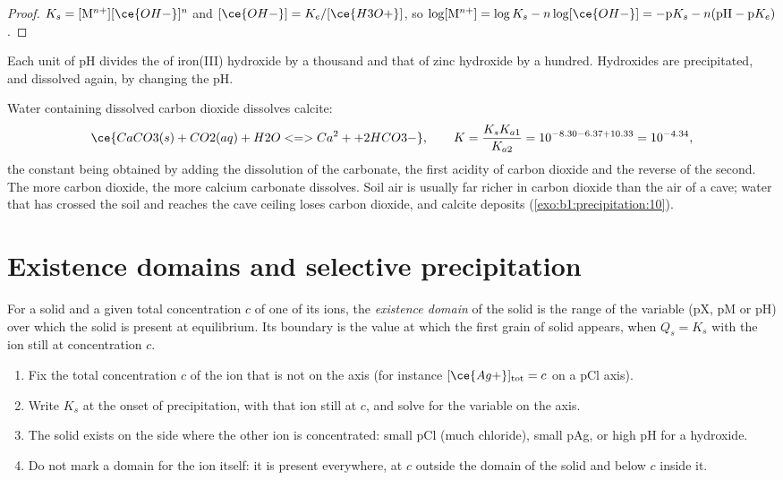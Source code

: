 \begin{proof}
$K_s = [\mathrm{M}^{n+}][\ce{OH-}]^n$ and $[\ce{OH-}] = K_e/[\ce{H3O+}]$,
so $\log[\mathrm{M}^{n+}] = \log K_s - n\log[\ce{OH-}] = -\mathrm{p}K_s -
n(\mathrm{pH} - \mathrm{p}K_e)$.
\end{proof}

Each unit of pH divides the  of iron(III) hydroxide by a
thousand and that of zinc hydroxide by a hundred. Hydroxides are
precipitated, and dissolved again, by changing the pH.

\begin{example}\label{ex:b1:precipitation:cave}
Water containing dissolved carbon dioxide dissolves calcite:
\[
  \ce{CaCO3(s) + CO2(aq) + H2O <=> Ca^2+ + 2HCO3-}, \qquad
  K = \frac{K_s K_{a1}}{K_{a2}} = 10^{-8.30 - 6.37 + 10.33} = 10^{-4.34} ,
\]
the constant being obtained by adding the dissolution of the carbonate,
the first acidity of carbon dioxide and the reverse of the second. The
more carbon dioxide, the more calcium carbonate dissolves. Soil air is usually
far richer in carbon dioxide than the air of a cave; water that has
crossed the soil and reaches the cave ceiling loses carbon dioxide, and
calcite deposits (\cref{exo:b1:precipitation:10}).
\end{example}

\section{Existence domains and selective precipitation}\label{sec:b1:precipitation:domains}

\begin{definition}\label{def:b1:precipitation:existence-domain}
For a solid and a given total concentration $c$ of one of its ions, the
\emph{existence domain} of the solid is the range
of the variable (pX, pM or pH) over which the solid is present at
equilibrium. Its boundary is the value at which the first grain of solid
appears, when $Q_s = K_s$ with the ion still at concentration $c$.
\end{definition}

\begin{method}\label{met:b1:precipitation:existence-domain}
\begin{enumerate}
  \item Fix the total concentration $c$ of the ion that is not on the
        axis (for instance $[\ce{Ag+}]_{\mathrm{tot}} = c$ on a pCl axis).
  \item Write $K_s$ at the onset of precipitation, with that ion still at
        $c$, and solve for the variable on the axis.
  \item The solid exists on the side where the other ion is
        concentrated: small pCl (much chloride), small pAg, or high pH
        for a hydroxide.
  \item Do not mark a domain for the ion itself: it is present
        everywhere, at $c$ outside the domain of the solid and below $c$
        inside it.
\end{enumerate}
\end{method}

